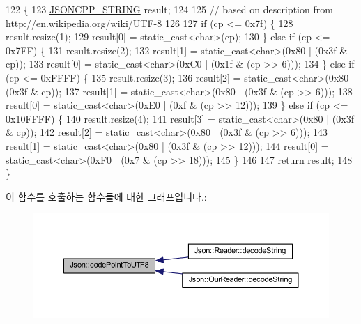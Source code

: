 \begin{DoxyCode}
122                                                               \{
123   \hyperlink{json-forwards_8h_a1e723f95759de062585bc4a8fd3fa4be}{JSONCPP\_STRING} result;
124 
125   \textcolor{comment}{// based on description from http://en.wikipedia.org/wiki/UTF-8}
126 
127   \textcolor{keywordflow}{if} (cp <= 0x7f) \{
128     result.resize(1);
129     result[0] = \textcolor{keyword}{static\_cast<}\textcolor{keywordtype}{char}\textcolor{keyword}{>}(cp);
130   \} \textcolor{keywordflow}{else} \textcolor{keywordflow}{if} (cp <= 0x7FF) \{
131     result.resize(2);
132     result[1] = \textcolor{keyword}{static\_cast<}\textcolor{keywordtype}{char}\textcolor{keyword}{>}(0x80 | (0x3f & cp));
133     result[0] = \textcolor{keyword}{static\_cast<}\textcolor{keywordtype}{char}\textcolor{keyword}{>}(0xC0 | (0x1f & (cp >> 6)));
134   \} \textcolor{keywordflow}{else} \textcolor{keywordflow}{if} (cp <= 0xFFFF) \{
135     result.resize(3);
136     result[2] = \textcolor{keyword}{static\_cast<}\textcolor{keywordtype}{char}\textcolor{keyword}{>}(0x80 | (0x3f & cp));
137     result[1] = \textcolor{keyword}{static\_cast<}\textcolor{keywordtype}{char}\textcolor{keyword}{>}(0x80 | (0x3f & (cp >> 6)));
138     result[0] = \textcolor{keyword}{static\_cast<}\textcolor{keywordtype}{char}\textcolor{keyword}{>}(0xE0 | (0xf & (cp >> 12)));
139   \} \textcolor{keywordflow}{else} \textcolor{keywordflow}{if} (cp <= 0x10FFFF) \{
140     result.resize(4);
141     result[3] = \textcolor{keyword}{static\_cast<}\textcolor{keywordtype}{char}\textcolor{keyword}{>}(0x80 | (0x3f & cp));
142     result[2] = \textcolor{keyword}{static\_cast<}\textcolor{keywordtype}{char}\textcolor{keyword}{>}(0x80 | (0x3f & (cp >> 6)));
143     result[1] = \textcolor{keyword}{static\_cast<}\textcolor{keywordtype}{char}\textcolor{keyword}{>}(0x80 | (0x3f & (cp >> 12)));
144     result[0] = \textcolor{keyword}{static\_cast<}\textcolor{keywordtype}{char}\textcolor{keyword}{>}(0xF0 | (0x7 & (cp >> 18)));
145   \}
146 
147   \textcolor{keywordflow}{return} result;
148 \}
\end{DoxyCode}
이 함수를 호출하는 함수들에 대한 그래프입니다.\+:\nopagebreak
\begin{figure}[H]
\begin{center}
\leavevmode
\includegraphics[width=350pt]{namespace_json_a33f8bda65a5b1fc4f5ddc39cb03dc742_icgraph}
\end{center}
\end{figure}
\mbox{\label{namespace_json_aa11b210ff98a4f4dd4e2df19260f8c3a}} 
